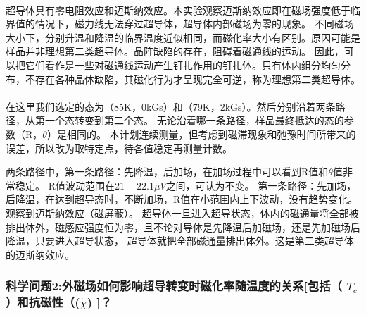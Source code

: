 \documentclass{ctexart}
\theoremstyle{ansstyle}
\begin{document}
\paragraph*{}超导体具有零电阻效应和迈斯纳效应。本实验观察迈斯纳效应即在磁场强度低于临界值的情况下，磁力线无法穿过超导体，超导体内部磁场为零的现象。
不同磁场大小下，分别升温和降温的临界温度近似相同，而磁化率大小有区别。原因可能是样品并非理想第二类超导体。晶阵缺陷的存在，阻碍着磁通线的运动。
因此，可以把它们看作是一些对磁通线运动产生钉扎作用的钉扎体。只有体内组分均匀分布，不存在各种晶体缺陷，其磁化行为才呈现完全可逆，称为理想第二类超导体。
\paragraph{}在这里我们选定的态为（85K，0kGs）和（79K，2kGs）。然后分别沿着两条路径，从第一个态转变到第二个态。
无论沿着哪一条路径，样品最终抵达的态的参数（R，$\theta$）是相同的。
本计划连续测量，但考虑到磁滞现象和弛豫时间所带来的误差，所以改为取特定点，待各值稳定再测量计数。

两条路径中，第一条路径：先降温，后加场，在加场过程中可以看到R值和$\theta$值非常稳定。
R值波动范围在$21-22.1\mu V$之间，可认为不变。
第一条路径：先加场，后降温，在达到超导态时，不断加场，R值在小范围内上下波动，没有趋势变化。观察到迈斯纳效应（磁屏蔽）。
超导体一旦进入超导状态，体内的磁通量将全部被排出体外，磁感应强度恒为零，且不论对导体是先降温后加磁场，还是先加磁场后降温，只要进入超导状态，
超导体就把全部磁通量排出体外。这是第二类超导体的迈斯纳效应。
\subsubsection{科学问题2:外磁场如何影响超导转变时磁化率随温度的关系[包括（ $T_{c}$）和抗磁性（($\tilde{\chi}$) ]？}
\end{document}
